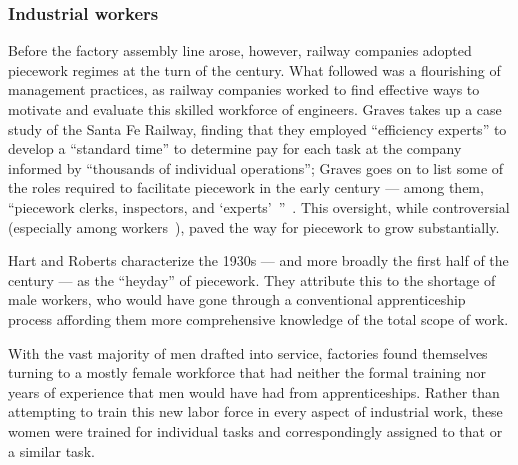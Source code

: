 \documentclass[pn4226]{subfiles}
\begin{document}
\subsubsection{Industrial workers}
Before the factory assembly line arose, however, railway companies adopted piecework regimes at the turn of the  century.
What followed was a flourishing of management practices,
as railway companies worked to find effective ways
to motivate and evaluate this skilled workforce of engineers.
Graves takes up a case study of the Santa Fe Railway,
finding that they employed ``efficiency experts'' to develop a ``standard time''
to determine pay for each task at the company informed by
``thousands of individual operations'';
Graves goes on to list
some of the roles required to facilitate piecework
in the early  century
--- among them, ``piecework clerks, inspectors, and `experts'~''~\cite{10.2307/23702539}.
This oversight, while controversial
(especially among workers~\cite{american1921problem}),
paved the way for piecework to grow substantially.

Hart and Roberts characterize the 1930s
--- and more broadly the first half of the  century ---
as the ``heyday'' of piecework.
They attribute this to the shortage of male workers,
who would have gone through a conventional apprenticeship process
affording them more comprehensive knowledge of the total scope of work.

With the vast majority of men drafted into service,
factories found themselves turning to
a mostly female workforce that had neither
the formal training nor
years of experience that men would have had from apprenticeships.
Rather than attempting to train this new labor force in every aspect of industrial work,
these women were trained for individual tasks
and correspondingly assigned to that or a similar task.

\begin{comment}
What did I pull from the threads that are related to industrial and railroad workers (i.e. 1920 onward?)

- Graves: railway companies used ``efficiency experts'' to study how long tasks should take
- Hart: evaluation limits complexity (we can affect that with peer evaluation!)
- Graves: sparks of Scientific Management in Piecework
- organization types are important determinants of piecework viability: lots of types of tasks? bad
  - Hart (I think?): variability in *worker* quality is fine
- Foreman is important
- Worker advocacy groups arose to speak out against piecework

\end{comment}
\end{document}

